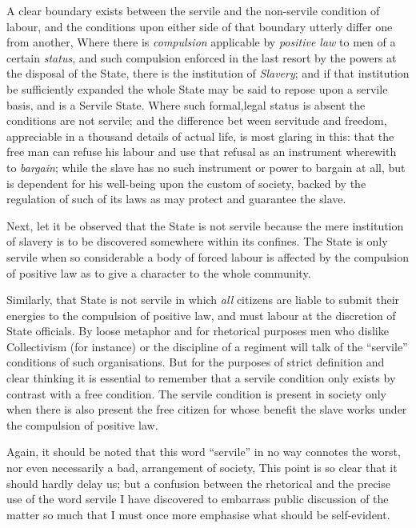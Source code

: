 \documentclass{book}
\begin{document}
A clear boundary exists between the servile and the non-servile condition of labour, and the conditions upon either side of that boundary utterly differ one from another, Where there is \emph{compulsion} applicable by \emph{positive law} to men of a certain \emph{status}, and such compulsion enforced in the last resort by the powers at the disposal of the State, there is the institution of \emph{Slavery}; and if that institution be sufficiently expanded the whole State may be said to repose upon a servile basis, and is a Servile State. Where such formal,legal status is absent the conditions are not servile; and the difference bet ween servitude and freedom, appreciable in a thousand details of actual life, is most glaring in this: that the free man can refuse his labour and use that refusal as an instrument wherewith to \emph{bargain}; while the slave has no such instrument or power to bargain at all, but is dependent for his well-being upon the custom of society, backed by the regulation of such of its laws as may protect and guarantee the slave.

Next, let it be observed that the State is not servile because the mere institution of slavery is to be discovered somewhere within its confines. The State is only servile when so considerable a body of forced labour is affected by the compulsion of positive law as to give a character to the whole community.

Similarly, that State is not servile in which \emph{all} citizens are liable to submit their energies to the compulsion of positive law, and must labour at the discretion of State officials. By loose metaphor and for rhetorical purposes men who dislike Collectivism (for instance) or the discipline of a regiment will talk of the “servile” conditions of such organisations. But for the purposes of strict definition and clear thinking it is essential to remember that a servile condition only exists by contrast with a free condition. The servile condition is present in society only when there is also present the free citizen for whose benefit the slave works under the compulsion of positive law.

Again, it should be noted that this word “servile” in no way connotes the worst, nor even necessarily a bad, arrangement of society, This point is so clear that it should hardly delay us; but a confusion between the rhetorical and the precise use of the word servile I have discovered to embarrass public discussion of the matter so much that I must once more emphasise what should be self-evident.
\end{document}
